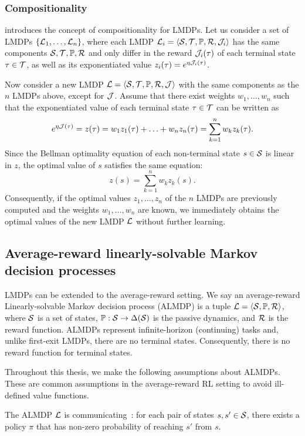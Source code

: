 \subsubsection{Compositionality}
\label{section:compositionality}
\citet{Todorov2009a} introduces the concept of compositionality for LMDPs. Let us consider a set of LMDPs $\{\mathcal{L}_1,\ldots,\mathcal{L}_n\}$, where each LMDP $\mathcal{L}_i=\langle\mathcal{S},\mathcal{T},\mathbb{P},\mathcal{R},\mathcal{J}_i\rangle$ has the same components $\mathcal{S},\mathcal{T},\mathbb{P},\mathcal{R}$ and only differ in the reward $\mathcal{J}_i(\tau)$ of each terminal state $\tau\in\mathcal{T}$, as well as its exponentiated value $z_i(\tau)=e^{\eta \mathcal{J}_i(\tau)}$.

Now consider a new LMDP $\mathcal{L}=\langle\mathcal{S},\mathcal{T},\mathbb{P},\mathcal{R},\mathcal{J}\rangle$ with the same components as the $n$ LMDPs above, except for $\mathcal{J}$. Assume that there exist weights $w_1,\ldots,w_n$ such that the exponentiated value of each terminal state $\tau\in\mathcal{T}$ can be written as
\[
e^{\eta \mathcal{J}(\tau)} = z(\tau) = w_1z_1(\tau) + \ldots + w_nz_n(\tau) = \sum_{k=1}^n w_kz_k(\tau).
\]
Since the Bellman optimality equation of each non-terminal state $s\in\mathcal{S}$ is linear in $z$, the optimal value of $s$ satisfies the same equation:
\[
z(s) = \sum_{k=1}^n w_kz_k(s).
\]
Consequently, if the optimal values $z_1,\ldots,z_n$ of the $n$ LMDPs are previously computed and the weights $w_1,\ldots,w_n$ are known, we immediately obtains the optimal values of the new LMDP $\mathcal{L}$ without further learning.


\subsection{Average-reward linearly-solvable Markov decision processes}

LMDPs can be extended to the average-reward setting. We say an average-reward Linearly-solvable Markov decision process (ALMDP) is a tuple
$\mathcal{L} = \langle\mathcal{S},\mathbb{P},\mathcal{R}\rangle$, where $\mathcal{S}$ is a set of states, $\mathbb{P}:\mathcal{S}\rightarrow\Delta(\mathcal{S})$ is the passive dynamics, and $\mathcal{R}$ is the reward function. ALMDPs represent infinite-horizon (continuing) tasks and, unlike first-exit LMDPs, there are no terminal states. Consequently, there is no reward function for terminal states.  

Throughout this thesis, we make the following assumptions about ALMDPs. These are common assumptions in the average-reward RL setting to avoid ill-defined value functions.

\begin{assumption}
  The ALMDP $\mathcal{L}$ is communicating~\citep{Puterman1994}: for each pair of states $s,s'\in\mathcal{S}$, there exists a policy $\pi$ that has non-zero probability of reaching $s'$ from $s$.
  \label{ass:communicating}
\end{assumption}

